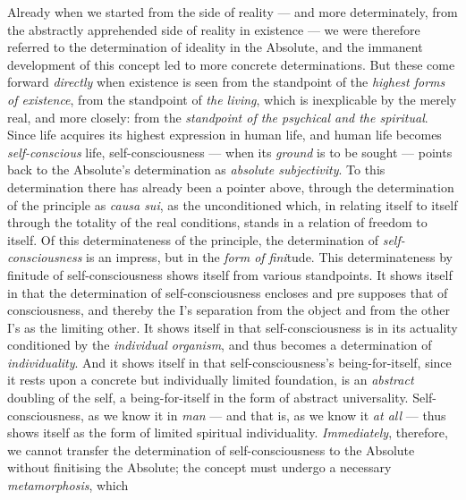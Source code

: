 \documentclass[12pt,a4paper]{book}
\begin{document}
Already when we started from the side of reality --- and more determinately,
from the abstractly apprehended side of reality in existence --- we were
therefore referred to the determination of ideality in the Absolute, and the
immanent development of this concept led to more concrete determinations. But
these come forward \emph{directly} when existence is seen from the standpoint
of the \emph{highest forms of existence}, from the standpoint of \emph{the
living}, which is inexplicable by the merely real, and more closely: from the
\emph{standpoint of the psychical and the spiritual}. Since life acquires its
highest expression in human life, and human life becomes \emph{self-conscious}
life, self-consciousness --- when its \emph{ground} is to be sought --- points
back to the Absolute's determination as \emph{absolute subjectivity}. To this
determination there has already been a pointer above, through the
determination of the principle as \textit{causa sui}, as the unconditioned
which, in relating itself to itself through the totality of the real
conditions, stands in a relation of freedom to itself. Of this determinateness
of the principle, the determination of \emph{self-consciousness} is an
impress, but in the \emph{form of fini}tude. This determinateness by finitude
of self-consciousness shows itself from various standpoints. It shows itself
in that the determination of self-consciousness encloses and pre\-%
supposes that of consciousness, and thereby the I's separation from the object
and from the other I's as the limiting other. It shows itself in that
self-consciousness is in its actuality conditioned by the \emph{individual
organism}, and thus becomes a determination of \emph{individuality}. And it
shows itself in that self-consciousness's being-for-itself, since it rests
upon a concrete but individually limited foundation, is an \emph{abstract}
doubling of the self, a being-for-itself in the form of abstract universality.
Self-consciousness, as we know it in \emph{man} --- and that is, as we know it
\emph{at all} --- thus shows itself as the form of limited spiritual
individuality. \emph{Immediately}, therefore, we cannot transfer the
determination of self-consciousness to the Absolute without finitising the
Absolute; the concept must undergo a necessary \emph{metamorphosis}, which
\end{document}
